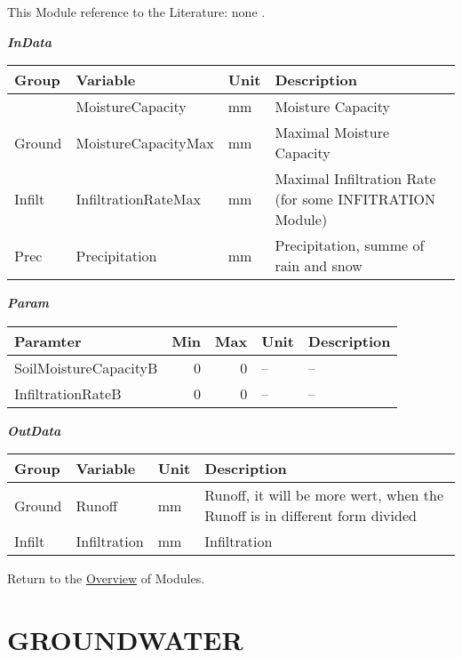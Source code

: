 \documentclass[
]{book}
\begin{document}
This Module reference to the Literature: none \citep{none}.

\textbf{\emph{InData}}

\begin{table}[!h]
\centering
\begin{tabular}{l|l|l|l}
\hline
Group & Variable & Unit & Description\\
\hline
 & MoistureCapacity & mm & Moisture Capacity\\
\cline{2-4}
\multirow{-2}{*}{\raggedright\arraybackslash Ground} & MoistureCapacityMax & mm & Maximal Moisture Capacity\\
\cline{1-4}
Infilt & InfiltrationRateMax & mm & Maximal Infiltration Rate (for some INFITRATION Module)\\
\cline{1-4}
Prec & Precipitation & mm & Precipitation, summe of rain and snow\\
\hline
\end{tabular}
\end{table}

\textbf{\emph{Param}}

\begin{table}[!h]
\centering
\begin{tabular}{l|r|r|l|l}
\hline
Paramter & Min & Max & Unit & Description\\
\hline
SoilMoistureCapacityB & 0 & 0 & -- & --\\
\cline{1-5}
InfiltrationRateB & 0 & 0 & -- & --\\
\hline
\end{tabular}
\end{table}

\textbf{\emph{OutData}}

\begin{table}[!h]
\centering
\begin{tabular}{l|l|l|l}
\hline
Group & Variable & Unit & Description\\
\hline
Ground & Runoff & mm & Runoff, it will be more wert, when the Runoff is in different form divided\\
\cline{1-4}
Infilt & Infiltration & mm & Infiltration\\
\hline
\end{tabular}
\end{table}

Return to the \protect\hyperlink{module}{Overview} of Modules.

\hypertarget{GROUNDWATER}{%
\section{GROUNDWATER}\label{GROUNDWATER}}
\end{document}
